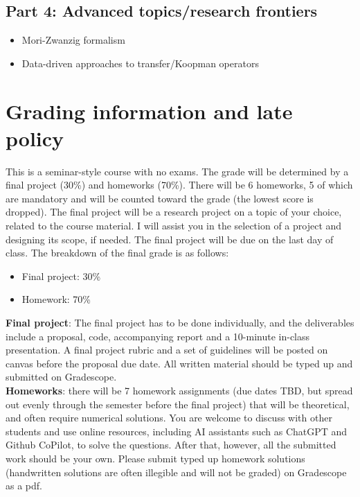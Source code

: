 \documentclass[12pt]{article}
\begin{document}
\subsection*{Part 4: Advanced topics/research frontiers}
\begin{itemize}
	\item Mori-Zwanzig formalism
	\item Data-driven approaches to transfer/Koopman operators
\end{itemize}

\section{Grading information and late policy}

This is a seminar-style course with no exams. The grade will be determined by a final project (30\%) and homeworks (70\%). There will be 6 homeworks, 5 of which are mandatory and will be counted toward the grade (the lowest score is dropped). The final project will be a research project on a topic of your choice, related to the course material. I will assist you in the selection of a project and designing its scope, if needed. The final project will be due on the last day of class. The breakdown of the final grade is as follows:
\begin{itemize}
	\item Final project: 30\%
	\item Homework: 70\% 
\end{itemize}

\textbf{Final project}: The final project has to be done individually, and the deliverables include a proposal, code, accompanying report and a 10-minute in-class presentation. A final project rubric and a set of guidelines will be posted on canvas before the proposal due date. All written material should be typed up and submitted on Gradescope.\\

\textbf{Homeworks}: there will be 7 homework assignments (due dates TBD, but spread out evenly through the semester before the final project) that will be theoretical, and often require numerical solutions. You are welcome to discuss with other students and use online resources, including AI assistants such as ChatGPT and Github CoPilot, to solve the questions. After that, however, all the submitted work should be your own. Please submit typed up homework solutions (handwritten solutions are often illegible and will not be graded) on Gradescope as a pdf. \\
\end{document}
